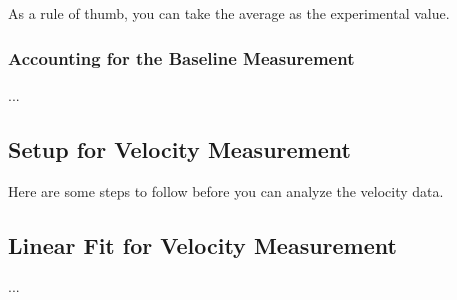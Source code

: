 As a rule of thumb, you can take the average as the experimental value.
\subsubsection{Accounting for the Baseline Measurement}
...
\subsection{Setup for Velocity Measurement}
Here are some steps to follow before you can analyze the velocity data.
\subsection{Linear Fit for Velocity Measurement}
...

